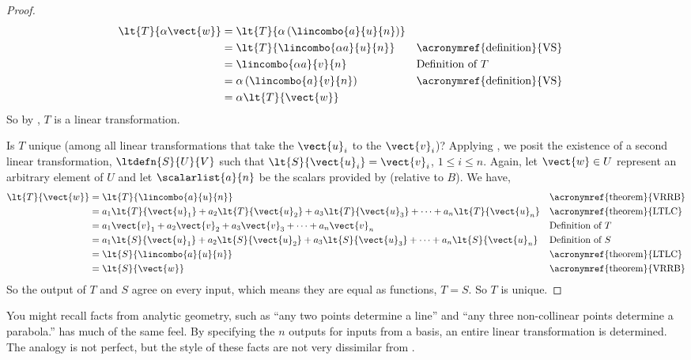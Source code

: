 \begin{proof}
\begin{align*}
\lt{T}{\alpha\vect{w}}&=
\lt{T}{\alpha\left(\lincombo{a}{u}{n}\right)}\\
%
&=
\lt{T}{\lincombo{\alpha a}{u}{n}}
&&\text{\acronymref{definition}{VS}}\\
%
&=\lincombo{\alpha a}{v}{n}
&&\text{Definition of $T$}\\
%
&=\alpha\left(\lincombo{a}{v}{n}\right)
&&\text{\acronymref{definition}{VS}}\\
%
&=\alpha\lt{T}{\vect{w}}
%
\end{align*}
%
So by , $T$ is a linear transformation.\par
%
Is $T$ unique (among all linear transformations that take the $\vect{u}_i$ to the $\vect{v}_i$)?  Applying , we posit the existence of a second linear transformation, $\ltdefn{S}{U}{V}$ such that $\lt{S}{\vect{u}_i}=\vect{v}_i$, $1\leq i\leq n$.  Again, let $\vect{w}\in U$ represent an arbitrary element of $U$ and let $\scalarlist{a}{n}$ be the scalars provided by  (relative to $B$).  We have,
%
\begin{align*}
\lt{T}{\vect{w}}&=
\lt{T}{\lincombo{a}{u}{n}}
&&\text{\acronymref{theorem}{VRRB}}\\
%
&=
a_1\lt{T}{\vect{u}_1}+
a_2\lt{T}{\vect{u}_2}+
a_3\lt{T}{\vect{u}_3}+
\cdots+
a_n\lt{T}{\vect{u}_n}
&&\text{\acronymref{theorem}{LTLC}}\\
%
&=
a_1\vect{v}_1+
a_2\vect{v}_2+
a_3\vect{v}_3+
\cdots+
a_n\vect{v}_n
&&\text{Definition of $T$}\\
%
&=
a_1\lt{S}{\vect{u}_1}+
a_2\lt{S}{\vect{u}_2}+
a_3\lt{S}{\vect{u}_3}+
\cdots+
a_n\lt{S}{\vect{u}_n}
&&\text{Definition of $S$}\\
%
&=
\lt{S}{\lincombo{a}{u}{n}}
&&\text{\acronymref{theorem}{LTLC}}\\
&=
\lt{S}{\vect{w}}
&&\text{\acronymref{theorem}{VRRB}}
%
\end{align*}
%
So the output of $T$ and $S$ agree on every input, which means they are equal as functions, $T=S$.  So $T$ is unique.
%
\end{proof}
%
You might recall facts from analytic geometry, such as ``any two points determine a line'' and ``any three non-collinear points determine a parabola.''   has much of the same feel.  By specifying the $n$ outputs for inputs from a basis, an entire linear transformation is determined.  The analogy is not perfect, but the style of these facts are not very dissimilar from .\par
